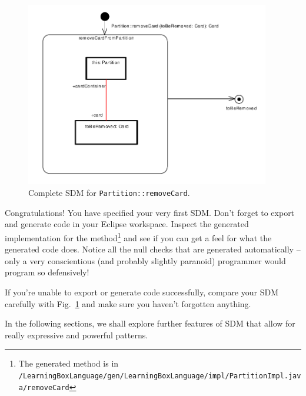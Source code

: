 \begin{figure}[htbp]
\begin{center}
  \includegraphics[width=0.95\textwidth]{pics/sdmBilder/removeCard/sdm15}
  \caption{Complete SDM for \texttt{Partition::removeCard}.}  
  \label{fig:sdm_complete_control_flow}
\end{center}
\end{figure}

Congratulations!  You have specified your very first SDM.  
Don't forget to export and generate code in your Eclipse workspace. 
Inspect the generated implementation for the method\footnote{The generated method is in \texttt{/Learning\-Box\-Language/\-gen/\-Learning\-Box\-Language/\-impl/\-Partition\-Impl.java/\-remove\-Card}} and see if you can get a feel for what the generated code does. 
Notice all the null checks that are generated automatically -- only a very conscientious (and probably slightly paranoid) programmer would program so defensively!

If you're unable to export or generate code successfully, compare your SDM carefully with Fig.~\ref{fig:sdm_complete_control_flow} and make sure you haven't forgotten anything.

In the following sections, we shall explore further features of SDM that allow for really expressive and powerful patterns.
